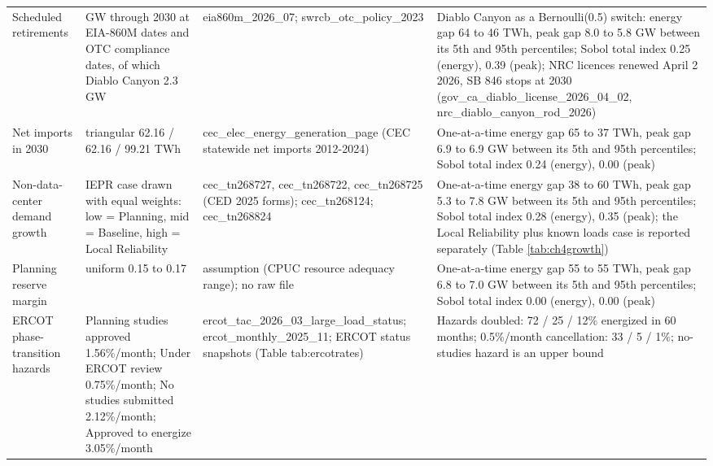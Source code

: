 \begin{longtable}{>{\raggedright\arraybackslash}p{2.3cm}>{\raggedright\arraybackslash}p{3.3cm}>{\raggedright\arraybackslash}p{2.8cm}>{\raggedright\arraybackslash}p{6.0cm}}
\addlinespace
Scheduled retirements & 6.5 GW through 2030 at EIA-860M dates and OTC compliance dates, of which Diablo Canyon 2.3 GW & eia860m\_\allowbreak{}2026\_\allowbreak{}07; swrcb\_\allowbreak{}otc\_\allowbreak{}policy\_\allowbreak{}2023 & Diablo Canyon as a Bernoulli(0.5) switch: energy gap 64 to 46 TWh, peak gap 8.0 to 5.8 GW between its 5th and 95th percentiles; Sobol total index 0.25 (energy), 0.39 (peak); NRC licences renewed April 2 2026, SB 846 stops at 2030 (gov\_\allowbreak{}ca\_\allowbreak{}diablo\_\allowbreak{}license\_\allowbreak{}2026\_\allowbreak{}04\_\allowbreak{}02, nrc\_\allowbreak{}diablo\_\allowbreak{}canyon\_\allowbreak{}rod\_\allowbreak{}2026) \\
\addlinespace
Net imports in 2030 & triangular 62.16 / 62.16 / 99.21 TWh & cec\_\allowbreak{}elec\_\allowbreak{}energy\_\allowbreak{}generation\_\allowbreak{}page (CEC statewide net imports 2012-2024) & One-at-a-time energy gap 65 to 37 TWh, peak gap 6.9 to 6.9 GW between its 5th and 95th percentiles; Sobol total index 0.24 (energy), 0.00 (peak) \\
\addlinespace
Non-data-center demand growth & IEPR case drawn with equal weights: low = Planning, mid = Baseline, high = Local Reliability & cec\_\allowbreak{}tn268727, cec\_\allowbreak{}tn268722, cec\_\allowbreak{}tn268725 (CED 2025 forms); cec\_\allowbreak{}tn268124; cec\_\allowbreak{}tn268824 & One-at-a-time energy gap 38 to 60 TWh, peak gap 5.3 to 7.8 GW between its 5th and 95th percentiles; Sobol total index 0.28 (energy), 0.35 (peak); the Local Reliability plus known loads case is reported separately (Table \ref{tab:ch4growth}) \\
\addlinespace
Planning reserve margin & uniform 0.15 to 0.17 & assumption (CPUC resource adequacy range); no raw file & One-at-a-time energy gap 55 to 55 TWh, peak gap 6.8 to 7.0 GW between its 5th and 95th percentiles; Sobol total index 0.00 (energy), 0.00 (peak) \\
\addlinespace
ERCOT phase-transition hazards & Planning studies approved 1.56\%/month; Under ERCOT review 0.75\%/month; No studies submitted 2.12\%/month; Approved to energize 3.05\%/month & ercot\_\allowbreak{}tac\_\allowbreak{}2026\_\allowbreak{}03\_\allowbreak{}large\_\allowbreak{}load\_\allowbreak{}status; ercot\_\allowbreak{}monthly\_\allowbreak{}2025\_\allowbreak{}11; ERCOT status snapshots (Table tab:ercotrates) & Hazards doubled: 72 / 25 / 12\% energized in 60 months; 0.5\%/month cancellation: 33 / 5 / 1\%; no-studies hazard is an upper bound \\

\end{longtable}
